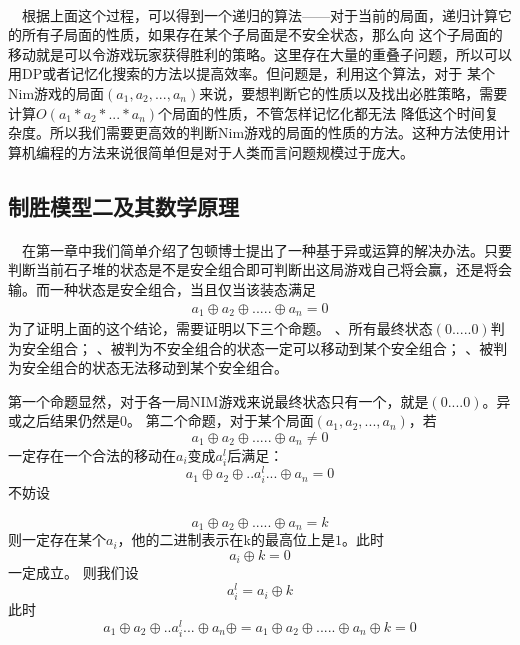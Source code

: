\documentclass[UTF8,nofonts,cs4size]{ctexrep}
\begin{document}
\paragraph*{}
\indent\ \
根据上面这个过程，可以得到一个递归的算法——对于当前的局面，递归计算它的所有子局面的性质，如果存在某个子局面是不安全状态，那么向
这个子局面的移动就是可以令游戏玩家获得胜利的策略。这里存在大量的重叠子问题，所以可以用DP或者记忆化搜索的方法以提高效率。但问题是，利用这个算法，对于
某个Nim游戏的局面$(a_1,a_2,...,a_n)$来说，要想判断它的性质以及找出必胜策略，需要计算$O(a_1*a_2*...*a_n)$个局面的性质，不管怎样记忆化都无法
降低这个时间复杂度。所以我们需要更高效的判断Nim游戏的局面的性质的方法。这种方法使用计算机编程的方法来说很简单但是对于人类而言问题规模过于庞大。

\subsection{制胜模型二及其数学原理}
\paragraph{}
\indent\ \
在第一章中我们简单介绍了包顿博士提出了一种基于异或运算的解决办法。只要判断当前石子堆的状态是不是安全组合即可判断出这局游戏自己将会赢，还是将会输。而一种状态是安全组合，当且仅当该装态满足
\begin{align}
a_1 \oplus a_2  \oplus  ..... \oplus  a_n  = 0
\end{align}
为了证明上面的这个结论，需要证明以下三个命题。
\newline
{}、所有最终状态$(0.....0)$判为安全组合；
\newline
{}、被判为不安全组合的状态一定可以移动到某个安全组合；
\newline
{}、被判为安全组合的状态无法移动到某个安全组合。

\indent
第一个命题显然，对于各一局NIM游戏来说最终状态只有一个，就是$(0....0)$。异或之后结果仍然是$0$。
\newline
\indent
第二个命题，对于某个局面$(a_1,a_2,...,a_n)$，若
\[a_1 \oplus a_2  \oplus  ..... \oplus  a_n  \neq 0\]
一定存在一个合法的移动在$a_i$变成$a_i^l$后满足：
\[a_1 \oplus a_2  \oplus  .. a_i^l... \oplus  a_n  = 0\]
不妨设

\[a_1 \oplus a_2  \oplus  ..... \oplus  a_n  = k\]
则一定存在某个$a_i$，他的二进制表示在k的最高位上是$1$。此时\[a_i \oplus k = 0\]一定成立。
则我们设\[a_i^l = a_i \oplus k\]
此时
\[a_1 \oplus a_2  \oplus  .. a_i^l... \oplus  a_n \oplus = a_1 \oplus a_2  \oplus  ..... \oplus  a_n \oplus k= 0\]
\end{document}
